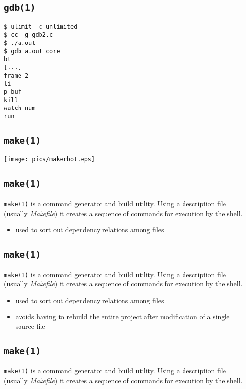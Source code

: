 \documentclass[xga]{xdvislides}
\begin{document}
\subsection{{\tt gdb(1)}}
\begin{verbatim}
$ ulimit -c unlimited
$ cc -g gdb2.c
$ ./a.out
$ gdb a.out core
bt
[...]
frame 2
li
p buf
kill
watch num
run
\end{verbatim}


\subsection{{\tt make(1)}}

\begin{center}
	\texttt{[image: pics/makerbot.eps]}
\end{center}

\subsection{{\tt make(1)}}
{\tt make(1)} is a command generator and build utility. Using a
description file (usually {\em Makefile}) it creates a sequence of
commands for execution by the shell.

\begin{itemize}
	\item used to sort out dependency relations among files
\end{itemize}

\subsection{{\tt make(1)}}
{\tt make(1)} is a command generator and build utility. Using a
description file (usually {\em Makefile}) it creates a sequence of
commands for execution by the shell.

\begin{itemize}
	\item used to sort out dependency relations among files
	\item avoids having to rebuild the entire project after modification of a
		single source file
\end{itemize}

\subsection{{\tt make(1)}}
{\tt make(1)} is a command generator and build utility. Using a
description file (usually {\em Makefile}) it creates a sequence of
commands for execution by the shell.
\end{document}
